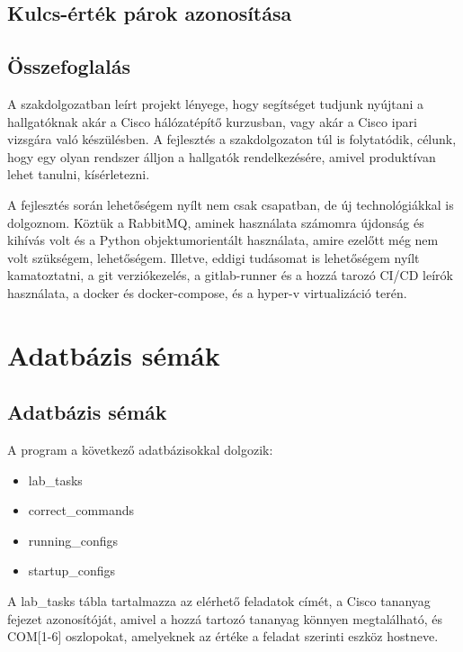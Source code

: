 \documentclass[12pt]{report}
\begin{document}
\section{Kulcs-érték párok azonosítása}

\section{Összefoglalás}

A szakdolgozatban leírt projekt lényege, hogy segítséget tudjunk nyújtani a hallgatóknak akár a Cisco hálózatépítő kurzusban, vagy akár a Cisco ipari vizsgára való készülésben. A fejlesztés a szakdolgozaton túl is folytatódik, célunk, hogy egy olyan rendszer álljon a hallgatók rendelkezésére, amivel produktívan lehet tanulni, kísérletezni.


A fejlesztés során lehetőségem nyílt nem csak csapatban, de új technológiákkal is dolgoznom. Köztük a RabbitMQ, aminek használata számomra újdonság és kihívás volt és a Python objektumorientált használata, amire ezelőtt még nem volt szükségem, lehetőségem. Illetve, eddigi tudásomat is lehetőségem nyílt kamatoztatni, a git verziókezelés, a gitlab-runner és a hozzá tarozó CI/CD leírók használata, a docker és docker-compose, és a hyper-v virtualizáció terén.

\chapter{Adatbázis sémák}
\section{Adatbázis sémák}


A program a következő adatbázisokkal dolgozik:

\singlespacing
\begin{itemize}
    \item lab\_tasks
    \item correct\_commands
    \item running\_configs
    \item startup\_configs
\end{itemize}

\onehalfspacing

A lab\_tasks tábla tartalmazza az elérhető feladatok címét, a Cisco tananyag fejezet azonosítóját, amivel a hozzá tartozó tananyag könnyen megtalálható, és COM[1-6] oszlopokat, amelyeknek az értéke a feladat szerinti eszköz hostneve.
\end{document}
